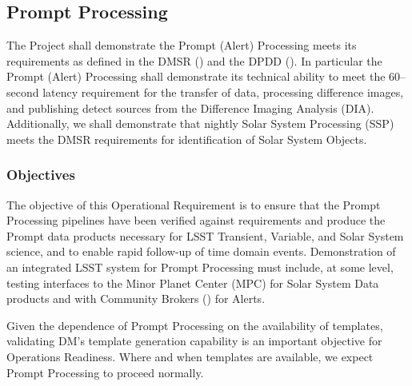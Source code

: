 \subsection{Prompt Processing}

The Project shall demonstrate the Prompt (Alert) Processing meets its requirements as defined in the DMSR () and the DPDD ().  In particular the Prompt (Alert) Processing shall demonstrate its technical ability to meet the 60--second latency requirement for the transfer of data, processing difference images, and publishing detect sources from the Difference Imaging Analysis (DIA).
Additionally, we shall demonstrate that nightly Solar System Processing (SSP) meets the DMSR requirements for identification of Solar System Objects.

\subsubsection{Objectives}
The objective of this Operational Requirement is to ensure that the Prompt Processing pipelines have been verified against requirements and produce the Prompt data products necessary for LSST Transient, Variable, and Solar System science, and to enable rapid follow-up of time domain events.
Demonstration of an integrated LSST system for Prompt Processing must include, at some level, testing interfaces to the Minor Planet Center (MPC) for Solar System Data products and with Community Brokers () for Alerts.

Given the dependence of Prompt Processing on the availability of templates, validating DM's template generation capability is an important objective for Operations Readiness.
Where and when templates are available, we expect Prompt Processing to proceed normally.

